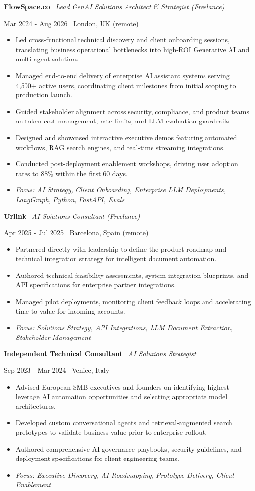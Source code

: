 \documentclass[a4paper,10pt]{article}
\newcommand{\role}[4]{%
  \vspace{2pt}\noindent
  \begin{minipage}[t]{0.70\textwidth}\raggedright\textbf{#1} \textbullet\ \textit{#3}\end{minipage}%
  \hfill
  \begin{minipage}[t]{0.28\textwidth}\raggedleft\footnotesize\color{gray}#2 \textbullet\ #4\end{minipage}%
  \vspace{1pt}%
}
\begin{document}
\role{\href{https://flowspace.co}{FlowSpace.co}}{Mar 2024 - Aug 2026}{Lead GenAI Solutions Architect \& Strategist (Freelance)}{London, UK (remote)}
\begin{itemize}
  \item Led cross-functional technical discovery and client onboarding sessions, translating business operational bottlenecks into high-ROI Generative AI and multi-agent solutions.
  \item Managed end-to-end delivery of enterprise AI assistant systems serving 4,500+ active users, coordinating client milestones from initial scoping to production launch.
  \item Guided stakeholder alignment across security, compliance, and product teams on token cost management, rate limits, and LLM evaluation guardrails.
  \item Designed and showcased interactive executive demos featuring automated workflows, RAG search engines, and real-time streaming integrations.
  \item Conducted post-deployment enablement workshops, driving user adoption rates to 88\% within the first 60 days.
  \item \textit{Focus: AI Strategy, Client Onboarding, Enterprise LLM Deployments, LangGraph, Python, FastAPI, Evals}
\end{itemize}

\role{Urlink}{Apr 2025 - Jul 2025}{AI Solutions Consultant (Freelance)}{Barcelona, Spain (remote)}
\begin{itemize}
  \item Partnered directly with leadership to define the product roadmap and technical integration strategy for intelligent document automation.
  \item Authored technical feasibility assessments, system integration blueprints, and API specifications for enterprise partner integrations.
  \item Managed pilot deployments, monitoring client feedback loops and accelerating time-to-value for incoming accounts.
  \item \textit{Focus: Solutions Strategy, API Integrations, LLM Document Extraction, Stakeholder Management}
\end{itemize}

\role{Independent Technical Consultant}{Sep 2023 - Mar 2024}{AI Solutions Strategist}{Venice, Italy}
\begin{itemize}
  \item Advised European SMB executives and founders on identifying highest-leverage AI automation opportunities and selecting appropriate model architectures.
  \item Developed custom conversational agents and retrieval-augmented search prototypes to validate business value prior to enterprise rollout.
  \item Authored comprehensive AI governance playbooks, security guidelines, and deployment specifications for client engineering teams.
  \item \textit{Focus: Executive Discovery, AI Roadmapping, Prototype Delivery, Client Enablement}
\end{itemize}
\end{document}
